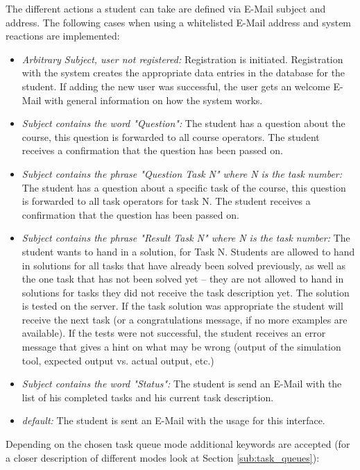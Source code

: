 The different actions a student can take are defined via E-Mail subject and address. The
following cases when using a whitelisted E-Mail address and system reactions are implemented:
\begin{itemize}
\item \textit{Arbitrary Subject, user not registered:} Registration is initiated. Registration with the
	system creates the appropriate data entries in the database for the student. If adding the new user was
	successful, the user gets an welcome E-Mail with general information on how the system works.
\item \textit{Subject contains the word "Question":} The student has a question about the course, this
	question is forwarded to all course operators. The student receives a confirmation that the
    question has been passed on.
\item \textit{Subject contains the phrase "Question Task N" where N is the task number:} The student
    has a question about a specific task of the course, this question is forwarded to all task operators
	for task N. The student receives a confirmation that the question has been passed on.
\item \textit{Subject contains the phrase "Result Task N" where N is the task number:} The student wants
    to hand in a solution, for Task N. Students are allowed to hand in solutions for all tasks that
    have already been solved previously, as well as the one task that has not been solved yet -- they
    are not allowed to hand in solutions for tasks they did not receive the task description yet. The
    solution is tested on the server. If the task solution was appropriate the student will receive the
    next task (or a congratulations message, if no more examples are available). If the tests were not
    successful, the student receives an error message that gives a hint on what may be wrong (output of the
    simulation tool, expected output vs. actual output, etc.)
\item \textit{Subject contains the word "Status":} The student is send an E-Mail with the list of
    his completed tasks and his current task description.
\item \textit{\textit{default:}} The student is sent an E-Mail with the usage for this interface.
\end{itemize}

\newpage

Depending on the chosen task queue mode additional keywords are accepted (for a closer description of different modes
look at Section \ref{sub:task_queues}):

